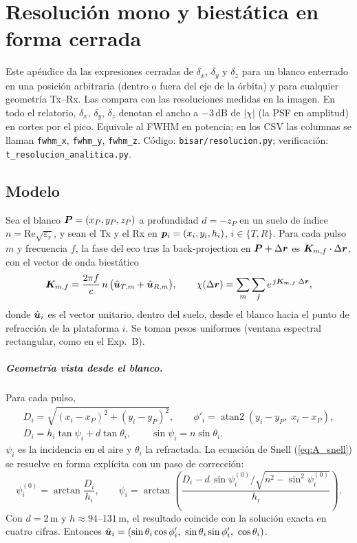 \chapter{Resolución mono y biestática en forma cerrada}
\label{ap:resolucion}

Este apéndice da las expresiones cerradas de $\delta_x$, $\delta_y$ y $\delta_z$ para un
blanco enterrado en una posición arbitraria (dentro o fuera del eje de la órbita) y
para cualquier geometría Tx--Rx. Las compara con las resoluciones medidas en la imagen.
En todo el relatorio, $\delta_x$, $\delta_y$, $\delta_z$ denotan el ancho a $-3$\,dB de
$|\chi|$ (la PSF en amplitud) en cortes por el pico. Equivale al FWHM en potencia; en los
CSV las columnas se llaman \texttt{fwhm\_x}, \texttt{fwhm\_y}, \texttt{fwhm\_z}. Código:
\texttt{bisar/resolucion.py}; verificación: \texttt{t\_resolucion\_analitica.py}.

\section{Modelo}

Sea el blanco $\bm{P}=(x_P,y_P,z_P)$ a profundidad $d=-z_P$ en un suelo de índice
$n=\mathrm{Re}\sqrt{\varepsilon_r}$, y sean el Tx y el Rx en $\bm{p}_i=(x_i,y_i,h_i)$,
$i\in\{T,R\}$. Para cada pulso $m$ y frecuencia $f$, la fase del eco tras la
back-projection en $\bm{P}+\Delta\bm{r}$ es $\bm{K}_{m,f}\cdot\Delta\bm{r}$, con el
vector de onda biestático
\begin{equation}
  \bm{K}_{m,f}=\frac{2\pi f}{c}\,n\,\big(\hat{\bm{u}}_{T,m}+\hat{\bm{u}}_{R,m}\big),
  \qquad
  \chi(\Delta\bm{r})=\sum_{m}\sum_{f} e^{\,j\bm{K}_{m,f}\cdot\Delta\bm{r}},
  \label{eq:A_psf}
\end{equation}
donde $\hat{\bm{u}}_i$ es el vector unitario, dentro del suelo, desde el blanco hacia el
punto de refracción de la plataforma $i$. Se toman pesos uniformes (ventana espectral
rectangular, como en el Exp.~B).

\paragraph{Geometría vista desde el blanco.} Para cada pulso,
\begin{gather}
  D_i=\sqrt{(x_i-x_P)^2+(y_i-y_P)^2},\qquad
  \phi'_i=\operatorname{atan2}(y_i-y_P,\;x_i-x_P),\label{eq:A_geo}\\
  D_i=h_i\tan\psi_i+d\tan\theta_i,\qquad \sin\psi_i=n\sin\theta_i .\label{eq:A_snell}
\end{gather}
$\psi_i$ es la incidencia en el aire y $\theta_i$ la refractada. La ecuación de Snell
(\ref{eq:A_snell}) se resuelve en forma explícita con un paso de corrección:
\begin{equation}
  \psi_i^{(0)}=\arctan\frac{D_i}{h_i},\qquad
  \psi_i=\arctan\!\left(\frac{D_i-d\,\sin\psi_i^{(0)}\big/\sqrt{n^2-\sin^2\psi_i^{(0)}}}{h_i}\right).
  \label{eq:A_psi}
\end{equation}
Con $d=2$\,m y $h\approx94$--$131$\,m, el resultado coincide con la solución exacta en
cuatro cifras. Entonces
$\hat{\vect u}_i=(\sin\theta_i\cos\phi'_i,\ \sin\theta_i\sin\phi'_i,\ \cos\theta_i)$.

